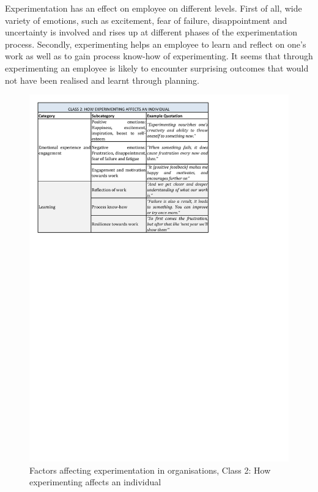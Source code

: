Experimentation has an effect on employee on different levels. First of all, wide variety of emotions, such as excitement, fear of failure, disappointment and uncertainty is involved and rises up at different phases of the experimentation process. Secondly, experimenting helps an employee to learn and reflect on one's work as well as to gain process know-how of experimenting. It seems that through experimenting an employee is likely to encounter surprising outcomes that would not have been realised and learnt through planning.  

\begin{figure}[!H]
\vspace{-30pt}
\hspace{-35pt}
\includegraphics{class2.pdf}
\vspace{-220pt}
\hspace{-400pt}
\caption{Factors affecting experimentation in organisations, Class 2: How experimenting affects an individual}
\label{tbl:class2}
\end{figure}

